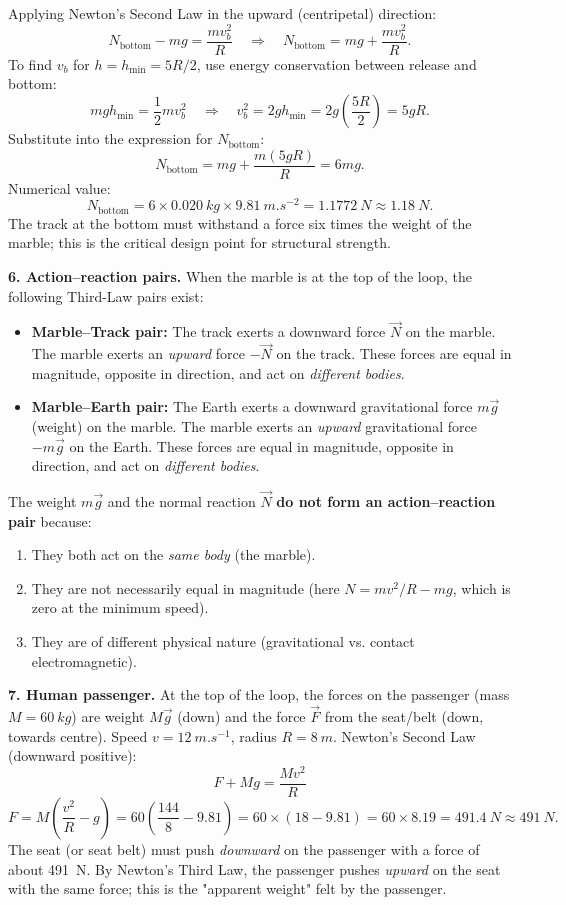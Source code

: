 \documentclass[11pt]{article}
\begin{document}
Applying Newton's Second Law in the upward (centripetal) direction:
\[ N_{\text{bottom}} - mg = \frac{m v_b^2}{R} \quad\Longrightarrow\quad N_{\text{bottom}} = mg + \frac{m v_b^2}{R}. \]
To find $v_b$ for $h = h_{\min} = 5R/2$, use energy conservation between release and bottom:
\[ mgh_{\min} = \frac{1}{2}m v_b^2 \quad\Longrightarrow\quad v_b^2 = 2gh_{\min} = 2g\left(\frac{5R}{2}\right) = 5gR. \]
Substitute into the expression for $N_{\text{bottom}}$:
\[ N_{\text{bottom}} = mg + \frac{m(5gR)}{R} = 6mg. \]
Numerical value:
\[ N_{\text{bottom}} = 6 \times \SI{0.020}{kg} \times \SI{9.81}{m.s^{-2}} = \SI{1.1772}{N} \approx \SI{1.18}{N}. \]
The track at the bottom must withstand a force six times the weight of the marble; this is the critical design point for structural strength.

\textbf{6. Action--reaction pairs.} When the marble is at the top of the loop, the following Third-Law pairs exist:
\begin{itemize}
\item \textbf{Marble--Track pair:} The track exerts a downward force $\vec{N}$ on the marble. The marble exerts an \emph{upward} force $-\vec{N}$ on the track. These forces are equal in magnitude, opposite in direction, and act on \emph{different bodies}.
\item \textbf{Marble--Earth pair:} The Earth exerts a downward gravitational force $m\vec{g}$ (weight) on the marble. The marble exerts an \emph{upward} gravitational force $-m\vec{g}$ on the Earth. These forces are equal in magnitude, opposite in direction, and act on \emph{different bodies}.
\end{itemize}
The weight $m\vec{g}$ and the normal reaction $\vec{N}$ \textbf{do not form an action--reaction pair} because:
\begin{enumerate}
\item They both act on the \emph{same body} (the marble).
\item They are not necessarily equal in magnitude (here $N = mv^2/R - mg$, which is zero at the minimum speed).
\item They are of different physical nature (gravitational vs. contact electromagnetic).
\end{enumerate}

\textbf{7. Human passenger.} At the top of the loop, the forces on the passenger (mass $M = \SI{60}{kg}$) are weight $M\vec{g}$ (down) and the force $\vec{F}$ from the seat/belt (down, towards centre). Speed $v = \SI{12}{m.s^{-1}}$, radius $R = \SI{8}{m}$.
Newton's Second Law (downward positive):
\[ F + Mg = \frac{M v^2}{R} \]
\[ F = M\left(\frac{v^2}{R} - g\right) = 60\left(\frac{144}{8} - 9.81\right) = 60 \times (18 - 9.81) = 60 \times 8.19 = \SI{491.4}{N} \approx \SI{491}{N}. \]
The seat (or seat belt) must push \emph{downward} on the passenger with a force of about \SI{491}{N}. By Newton's Third Law, the passenger pushes \emph{upward} on the seat with the same force; this is the "apparent weight" felt by the passenger.
\end{document}
